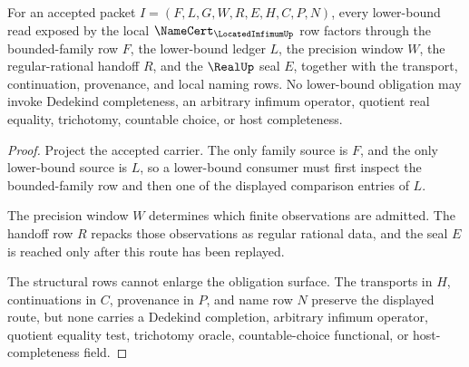 \begin{theorem}
\label{thm:located-infimum-lower-bound-obligation}
For an accepted packet $I=(F,L,G,W,R,E,H,C,P,N)$, every lower-bound read exposed by the local $\NameCert_{\LocatedInfimumUp}$ row factors through the bounded-family row $F$, the lower-bound ledger $L$, the precision window $W$, the regular-rational handoff $R$, and the $\RealUp$ seal $E$, together with the transport, continuation, provenance, and local naming rows. No lower-bound obligation may invoke Dedekind completeness, an arbitrary infimum operator, quotient real equality, trichotomy, countable choice, or host completeness.
\end{theorem}
\begin{proof}
Project the accepted carrier. The only family source is $F$, and the only lower-bound source is $L$, so a lower-bound consumer must first inspect the bounded-family row and then one of the displayed comparison entries of $L$.

The precision window $W$ determines which finite observations are admitted. The handoff row $R$ repacks those observations as regular rational data, and the seal $E$ is reached only after this route has been replayed.

The structural rows cannot enlarge the obligation surface. The transports in $H$, continuations in $C$, provenance in $P$, and name row $N$ preserve the displayed route, but none carries a Dedekind completion, arbitrary infimum operator, quotient equality test, trichotomy oracle, countable-choice functional, or host-completeness field.
\end{proof}

